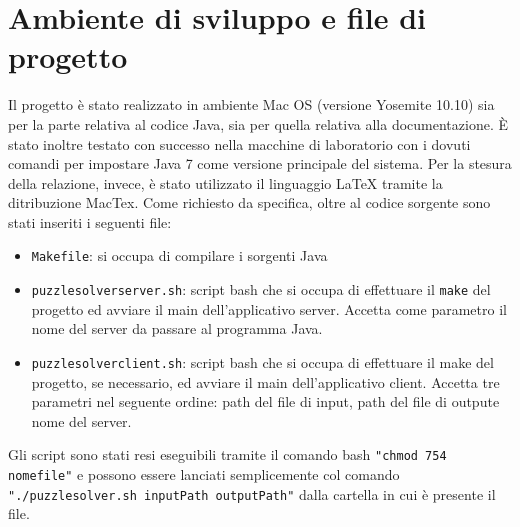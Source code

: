%
%

\section{Ambiente di sviluppo e file di progetto}
Il progetto \`{e} stato realizzato in ambiente Mac OS (versione Yosemite 10.10) sia per la parte relativa al codice Java,
sia per quella relativa alla documentazione.
\`{E} stato inoltre testato con successo nella macchine di laboratorio con i dovuti comandi per impostare Java 7 come
versione principale del sistema.
Per la stesura della relazione, invece, \`{e} stato utilizzato il linguaggio \LaTeX{}  tramite la ditribuzione MacTex.
Come richiesto da specifica, oltre al codice sorgente sono stati inseriti i seguenti file:
\begin{itemize}
    \item \texttt{Makefile}: si occupa di compilare i sorgenti Java
    \item \texttt{puzzlesolverserver.sh}: script bash che si occupa di effettuare il \texttt{make} del progetto
    ed avviare il main dell'applicativo server. Accetta come parametro il nome del server da passare al programma Java.
    \item \texttt{puzzlesolverclient.sh}: script bash che si occupa di effettuare il make del progetto, se necessario,
    ed avviare il main dell'applicativo client. Accetta tre parametri nel seguente ordine: path del file di input, path
    del file di outpute nome del server.
\end{itemize}
Gli script sono stati resi eseguibili tramite il comando bash \texttt{"chmod 754 nomefile"} e possono essere lanciati
semplicemente col comando \texttt{"./puzzlesolver.sh inputPath outputPath"} dalla cartella in cui è presente il file.

\clearpage
